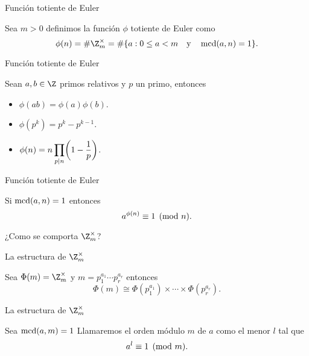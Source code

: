 \begin{frame}{Función totiente de Euler}
  \begin{definition}
    Sea $m>0$ definimos la función $\phi$ totiente de Euler como
    \[
        \phi(n) = \# \Z_m^\times = \# \{ a : 0\leq a < m \eqand \mcd(a,n)=1\}.
    \]
\end{definition}
\end{frame}


\begin{frame}{Función totiente de Euler}
  \begin{proposition}
    Sean $a,b \in \Z$ primos relativos y $p$ un primo, entonces
    \pause
    \begin{itemize}[<+->]
        \item $\phi(ab) = \phi(a)\phi(b)$.
        \bigskip

        \item $\phi(p^k) = p^{k}-p^{k-1}$.
        \bigskip

        \item $\ds \phi(n) = n \prod_{p\mid n}\paren{1 - \frac{1}{p}}$.
    \end{itemize}
\end{proposition}
\end{frame}


\begin{frame}{Función totiente de Euler}
  \begin{theorem}[Euler]
    Si $\operatorname{mcd}(a,n)=1$ entonces
    \[
        a^{\phi(n)} \equiv 1 \pmod{n}.
    \]
\end{theorem}
\end{frame}


\begin{frame}
  \begin{center}\fontsize{20}{24}\selectfont
    ¿Como se comporta $\Z_m^\times$?
  \end{center}
\end{frame}

\begin{frame}{La estructura de $\Z_m^\times$}
  \begin{theorem}
    Sea $\Phi(m) = \Z_m^\times$ y $m = p_1^{a_1} \cdots p_r^{a_r}$ entonces
    \[
        \Phi(m) \cong \Phi(p_1^{a_1}) \times \cdots \times \Phi(p_r^{a_r}).
    \]
  \end{theorem}
\end{frame}

\begin{frame}{La estructura de $\Z_m^\times$}
  \begin{definition}
    Sea $\operatorname{mcd}(a,m)=1$ Llamaremos el orden módulo $m$ de $a$ como el menor $l$ tal que
    \[
        a^l \equiv 1 \pmod{m}.
    \]
    \end{definition}
\end{frame}


